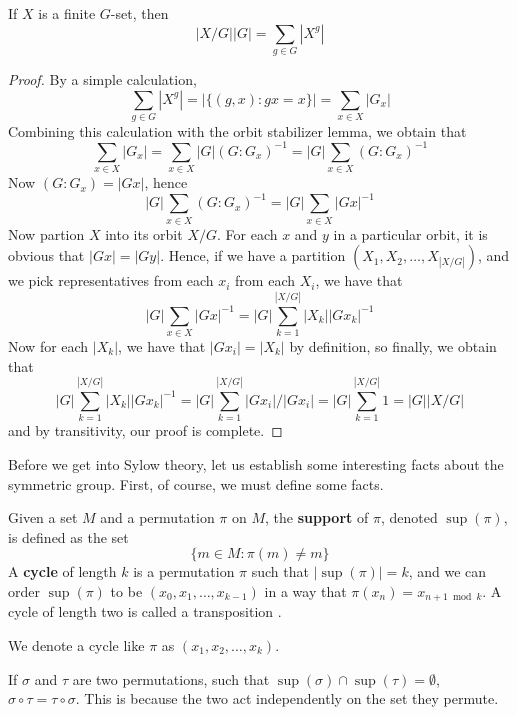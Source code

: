 \begin{lemma} 
    If $X$ is a finite $G$-set, then
    \[ |X/G||G| = \sum_{g \in G} |X^g| \]
\end{lemma}
\begin{proof}
    By a simple calculation,
    \[ \sum_{g \in G} |X^g| = |\{(g,x): gx = x\}| = \sum_{x \in X} |G_x| \]
    Combining this calculation with the orbit stabilizer lemma, we obtain that
    \[ \sum_{x \in X} |G_x| = \sum_{x \in X} |G|(G:G_x)^{-1} = |G| \sum_{x \in X} (G:G_x)^{-1} \]
    Now $(G:G_x) = |Gx|$, hence
    \[ |G| \sum_{x \in X} (G:G_x)^{-1} = |G| \sum_{x \in X} |Gx|^{-1} \]
    Now partion $X$ into its orbit $X/G$. For each $x$ and $y$ in a particular orbit, it is obvious that $|Gx| = |Gy|$. Hence, if we have a partition $(X_1, X_2, \dots, X_{|X/G|})$, and we pick representatives from each $x_i$ from each $X_i$, we have that
    \[ |G| \sum_{x \in X} |Gx|^{-1} = |G| \sum_{k = 1}^{|X/G|} |X_k||Gx_k|^{-1} \]
    Now for each $|X_k|$, we have that $|Gx_i| = |X_k|$ by definition, so finally, we obtain that
    \[ |G| \sum_{k = 1}^{|X/G|} |X_k||Gx_k|^{-1} = |G| \sum_{k = 1}^{|X/G|} |Gx_i|/|Gx_i| = |G| \sum_{k = 1}^{|X/G|} 1 = |G||X/G| \]
    and by transitivity, our proof is complete.
\end{proof}

Before we get into Sylow theory, let us establish some interesting facts about the symmetric group. First, of course, we must define some facts.

\begin{definition}
    Given a set $M$ and a permutation $\pi$ on $M$, the {\bf support}  of $\pi$, denoted $\sup(\pi)$, is defined as the set
    \[ \{ m \in M : \pi(m) \neq m \} \]
    A {\bf cycle}  of length $k$ is a permutation $\pi$ such that $|\sup(\pi)| = k$, and we can order $\sup(\pi)$ to be $(x_0, x_1, \dots, x_{k-1})$ in a way that $\pi(x_n) = x_{n+1 \bmod k}$. A cycle of length two is called a transposition .
\end{definition}

We denote a cycle like $\pi$ as $(x_1, x_2, \dots, x_k)$.

If $\sigma$ and $\tau$ are two permutations, such that $\sup(\sigma) \cap \sup(\tau) = \emptyset$, $\sigma \circ \tau = \tau \circ \sigma$. This is because the two act independently on the set they permute.

